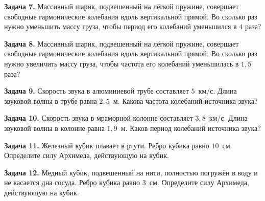 \begin{taskbasic}[code={\label{task:dem26_v7_n4}}]
\textbf{Задача 7.} Массивный шарик, подвешенный на лёгкой пружине, совершает свободные гармонические колебания вдоль вертикальной прямой. Во сколько раз нужно уменьшить массу груза, чтобы период его колебаний уменьшился в $4$ раза?

\end{taskbasic}

\begin{taskbasic}[code={\label{task:dem26_v8_n4}}]
\textbf{Задача 8.} Массивный шарик, подвешенный на лёгкой пружине, совершает свободные гармонические колебания вдоль вертикальной прямой. Во сколько раз нужно увеличить массу груза, чтобы частота его колебаний уменьшилась в $1{,}5$ раза?

\end{taskbasic}

\begin{taskbasic}[code={\label{task:dem26_v9_n4}}]
\textbf{Задача 9.} Скорость звука в алюминиевой трубе составляет $5$~км/с. Длина звуковой волны в трубе равна $2{,}5$~м. Какова частота колебаний источника звука?

\end{taskbasic}

\begin{taskbasic}[code={\label{task:dem26_v10_n4}}]
\textbf{Задача 10.} Скорость звука в мраморной колонне составляет $3{,}8$~км/с. Длина звуковой волны в колонне равна $1{,}9$~м. Каков период колебаний источника звука?

\end{taskbasic}

\begin{taskbasic}[code={\label{task:dem26_v11_n4}}]
\textbf{Задача 11.} Железный кубик плавает в ртути. Ребро кубика равно $10$~см. Определите силу Архимеда, действующую на кубик.

\end{taskbasic}

\begin{taskbasic}[code={\label{task:dem26_v12_n4}}]
\textbf{Задача 12.} Медный кубик, подвешенный на нити, полностью погружён в воду и не касается дна сосуда. Ребро кубика равно $3$~см. Определите силу Архимеда, действующую на кубик.

\end{taskbasic}

